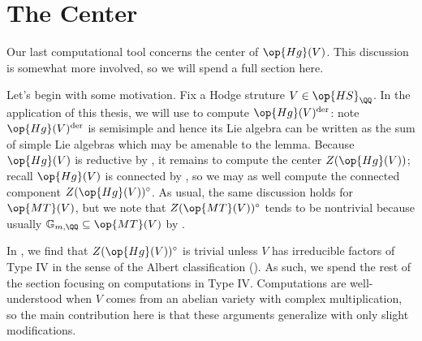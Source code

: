 \documentclass[../thesis.tex]{subfiles}
\begin{document}
\section{The Center}
Our last computational tool concerns the center of $\op{Hg}(V)$. This discussion is somewhat more involved, so we will spend a full section here.

Let's begin with some motivation. Fix a Hodge struture $V\in\op{HS}_\QQ$. In the application of this thesis, we will use  to compute $\op{Hg}(V)^{\mathrm{der}}$: note $\op{Hg}(V)^{\mathrm{der}}$ is semisimple and hence its Lie algebra can be written as the sum of simple Lie algebras which may be amenable to the lemma. Because $\op{Hg}(V)$ is reductive by , it remains to compute the center $Z(\op{Hg}(V))$; recall $\op{Hg}(V)$ is connected by , so we may as well compute the connected component $Z(\op{Hg}(V))^\circ$. As usual, the same discussion holds for $\op{MT}(V)$, but we note that $Z(\op{MT}(V))^\circ$ tends to be nontrivial because usually $\mathbb G_{m,\QQ}\subseteq\op{MT}(V)$ by .

In , we find that $Z(\op{Hg}(V))^\circ$ is trivial unless $V$ has irreducible factors of Type IV in the sense of the Albert classification (). As such, we spend the rest of the section focusing on computations in Type IV. Computations are well-understood when $V$ comes from an abelian variety with complex multiplication, so the main contribution here is that these arguments generalize with only slight modifications.
\end{document}
